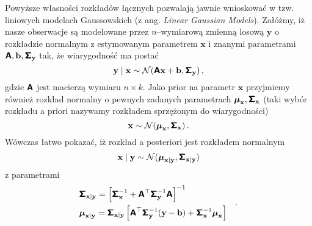 \documentclass{myclass}
\begin{document}
Powyższe własności rozkładów łącznych pozwalają jawnie wnioskować w tzw. liniowych modelach
Gaussowskich (z ang. \textit{Linear Gaussian Models}). Załóżmy, iż nasze obserwacje są modelowane
przez \(n\)--wymiarową zmienną losową \(\mathbf{y}\) o rozkładzie normalnym z estymowanym parametrem
\(\mathbf{x}\) i znanymi parametrami \(\boldsymbol{\mathsf{A}}, \mathbf{b}, \boldsymbol{\mathsf{\Sigma}}_\mathbf{y}\) tak, że
wiarygodność ma postać
\begin{equation*}
    \mathbf{y}\mid\mathbf{x} \sim \mathcal{N}(\boldsymbol{\mathsf{A}}\mathbf{x} + \mathbf{b}, \boldsymbol{\mathsf{\Sigma}}_\mathbf{y})\,,
\end{equation*}
gdzie \(\boldsymbol{\mathsf{A}}\) jest macierzą wymiaru \(n\times k\). Jako prior na parametr \(\mathbf{x}\)
przyjmiemy również rozkład normalny o pewnych zadanych parametrach \(\boldsymbol{\mu}_\mathbf{x},
\boldsymbol{\mathsf{\Sigma}}_\mathbf{x}\) (taki wybór rozkładu a priori nazywamy rozkładem sprzężonym do
wiarygodności)
\begin{equation*}
    \mathbf{x} \sim \mathcal{N}(\boldsymbol{\mu}_\mathbf{x}, \boldsymbol{\mathsf{\Sigma}}_\mathbf{x})\,.
\end{equation*}
Wówczas łatwo pokazać, iż rozkład a posteriori jest rozkładem normalnym
\begin{equation*}
    \mathbf{x} \mid \mathbf{y} \sim \mathcal{N}(\boldsymbol{\mu}_{\mathbf{x}|\mathbf{y}}, \boldsymbol{\mathsf{\Sigma}}_{\mathbf{x}|\mathbf{y}})
\end{equation*}
z parametrami
\begin{equation*}
    \begin{split}
        &\boldsymbol{\mathsf{\Sigma}}_{\mathbf{x}|\mathbf{y}} = \left[\boldsymbol{\mathsf{\Sigma}}_\mathbf{x}^{-1} + \boldsymbol{\mathsf{A}}^\top\boldsymbol{\mathsf{\Sigma}}_\mathbf{y}^{-1}\boldsymbol{\mathsf{A}}\right]^{-1}\\
        &\boldsymbol{\mu}_{\mathbf{x}|\mathbf{y}} = \boldsymbol{\mathsf{\Sigma}}_{\mathbf{x}|\mathbf{y}}\left[\boldsymbol{\mathsf{A}}^\top\boldsymbol{\mathsf{\Sigma}}_\mathbf{y}^{-1}(\mathbf{y} - \mathbf{b}) + \boldsymbol{\mathsf{\Sigma}}_\mathbf{x}^{-1}\boldsymbol{\mu}_\mathbf{x}\right]
    \end{split}\quad.
\end{equation*}
\end{document}
